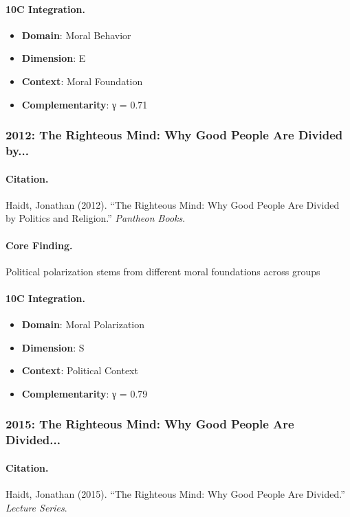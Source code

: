 \paragraph{10C Integration.}
\begin{itemize}[nosep]
  \item \textbf{Domain}: Moral Behavior
  \item \textbf{Dimension}: E
  \item \textbf{Context}: Moral Foundation
  \item \textbf{Complementarity}: γ = 0.71
\end{itemize}

\subsubsection{2012: The Righteous Mind: Why Good People Are Divided by...}

\paragraph{Citation.}
Haidt, Jonathan (2012). ``The Righteous Mind: Why Good People Are Divided by Politics and Religion.''
\textit{Pantheon Books}.

\paragraph{Core Finding.}
Political polarization stems from different moral foundations across groups

\paragraph{10C Integration.}
\begin{itemize}[nosep]
  \item \textbf{Domain}: Moral Polarization
  \item \textbf{Dimension}: S
  \item \textbf{Context}: Political Context
  \item \textbf{Complementarity}: γ = 0.79
\end{itemize}

\subsubsection{2015: The Righteous Mind: Why Good People Are Divided...}

\paragraph{Citation.}
Haidt, Jonathan (2015). ``The Righteous Mind: Why Good People Are Divided.''
\textit{Lecture Series}.

